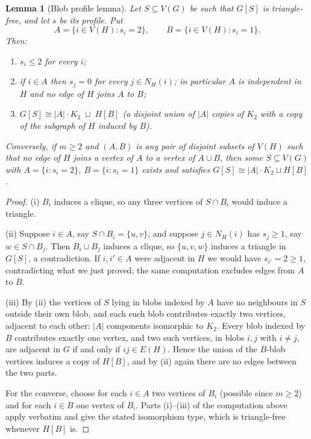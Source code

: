 \documentclass[10pt,a4paper]{article}
\theoremstyle{plain}
\newtheorem{lemma}[theorem]{Lemma}
\theoremstyle{definition}
\begin{document}
\begin{lemma}[Blob profile lemma]\label{lem:profile}
Let $S \subseteq V(G)$ be such that $G[S]$ is triangle-free, and let $s$ be its profile. Put
\[
A = \{i \in V(H) : s_i = 2\}, \qquad B = \{i \in V(H) : s_i = 1\}.
\]
Then:
\begin{enumerate}
\item[(i)] $s_i \le 2$ for every $i$;
\item[(ii)] if $i \in A$ then $s_j = 0$ for every $j \in N_H(i)$; in particular $A$ is
independent in $H$ and no edge of $H$ joins $A$ to $B$;
\item[(iii)] $G[S] \cong |A| \cdot K_2 \;\sqcup\; H[B]$ (a disjoint union of $|A|$ copies of
$K_2$ with a copy of the subgraph of $H$ induced by $B$).
\end{enumerate}
Conversely, if $m \ge 2$ and $(A,B)$ is any pair of disjoint subsets of $V(H)$ such that no edge
of $H$ joins a vertex of $A$ to a vertex of $A \cup B$, then some $S \subseteq V(G)$ with
$A = \{i : s_i = 2\}$, $B = \{i : s_i = 1\}$ exists and satisfies
$G[S] \cong |A| \cdot K_2 \sqcup H[B]$.
\end{lemma}

\begin{proof}
(i) $B_i$ induces a clique, so any three vertices of $S \cap B_i$ would induce a triangle.

(ii) Suppose $i \in A$, say $S \cap B_i = \{u,v\}$, and suppose $j \in N_H(i)$ has
$s_j \ge 1$, say $w \in S \cap B_j$. Then $B_i \cup B_j$ induces a clique, so $\{u,v,w\}$
induces a triangle in $G[S]$, a contradiction. If $i,i' \in A$ were adjacent in $H$ we would
have $s_{i'} = 2 \ge 1$, contradicting what we just proved; the same computation excludes edges
from $A$ to $B$.

(iii) By (ii) the vertices of $S$ lying in blobs indexed by $A$ have no neighbours in $S$
outside their own blob, and each such blob contributes exactly two vertices, adjacent to each
other: $|A|$ components isomorphic to $K_2$. Every blob indexed by $B$ contributes exactly one
vertex, and two such vertices, in blobs $i,j$ with $i \ne j$, are adjacent in $G$ if and only if
$ij \in E(H)$. Hence the union of the $B$-blob vertices induces a copy of $H[B]$, and by (ii)
again there are no edges between the two parts.

For the converse, choose for each $i \in A$ two vertices of $B_i$ (possible since $m \ge 2$) and
for each $i \in B$ one vertex of $B_i$. Parts (i)--(iii) of the computation above apply verbatim
and give the stated isomorphism type, which is triangle-free whenever $H[B]$ is.
\end{proof}
\end{document}
